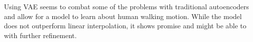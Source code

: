 Using VAE seems to combat some of the problems with traditional autoencoders and allow for a model to learn about human walking motion. While the model does not outperform linear interpolation, it shows promise and might be able to with further refinement.